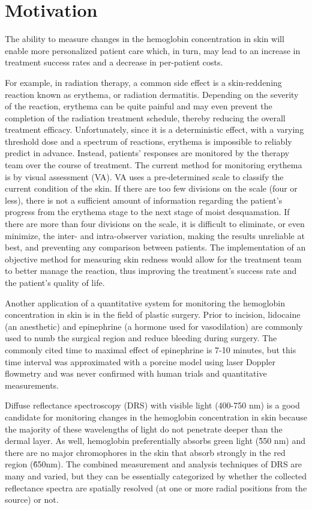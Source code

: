 \section{Motivation}
The ability to measure changes in the hemoglobin concentration in skin will enable more personalized patient care which, in turn, may lead to an increase in treatment success rates and a decrease in per-patient costs.

For example, in radiation therapy, a common side effect is a skin-reddening reaction known as erythema, or radiation dermatitis.\cite{McQuestion2006} Depending on the severity of the reaction, erythema can be quite painful and may even prevent the completion of the radiation treatment schedule, thereby reducing the overall treatment efficacy. Unfortunately, since it is a deterministic effect,\cite{Hall2000} with a varying threshold dose and a spectrum of reactions, erythema is impossible to reliably predict in advance.\cite{Porock2002} Instead, patients’ responses are monitored by the therapy team over the course of treatment. The current method for monitoring erythema is by visual assessment (VA). VA uses a pre-determined scale to classify the current condition of the skin. If there are too few divisions on the scale (four or less), there is not a sufficient amount of information regarding the patient’s progress from the erythema stage to the next stage of moist desquamation. If there are more than four divisions on the scale, it is difficult to eliminate, or even minimize, the inter- and intra-observer variation, making the results unreliable at best, and preventing any comparison between patients. The implementation of an objective method for measuring skin redness would allow for the treatment team to better manage the reaction, thus improving the treatment’s success rate and the patient’s quality of life.

Another application of a quantitative system for monitoring the hemoglobin concentration in skin is in the field of plastic surgery. Prior to incision, lidocaine (an anesthetic) and epinephrine (a hormone used for vasodilation) are commonly used to numb the surgical region and reduce bleeding during surgery. The commonly cited time to maximal effect of epinephrine is 7-10 minutes, but this time interval was approximated with a porcine model\cite{Larrabee1987} using laser Doppler flowmetry\cite{Swain1989} and was never confirmed with human trials and quantitative measurements.

Diffuse reflectance spectroscopy (DRS) with visible light (400-750 nm) is a good candidate for monitoring changes in the hemoglobin concentration in skin because the majority of these wavelengths of light do not penetrate deeper than the dermal layer. As well, hemoglobin preferentially absorbs green light (\~550 nm) and there are no major chromophores in the skin that absorb strongly in the red region (\~650nm). The combined measurement and analysis techniques of DRS are many and varied,\cite{Palmer2006} but they can be essentially categorized by whether the collected reflectance spectra are spatially resolved (at one or more radial positions from the source) or not.

